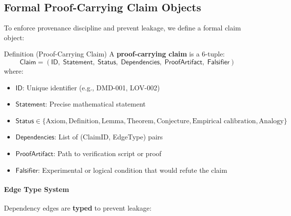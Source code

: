 
\subsection{Formal Proof-Carrying Claim Objects}

To enforce provenance discipline and prevent leakage, we define a formal claim object:

\begin{mytheorem}{Definition (Proof-Carrying Claim)}
\label{def:proof-carrying-claim}
A \textbf{proof-carrying claim} is a 6-tuple:
\[
\textsf{Claim} = (\textsf{ID},\; \textsf{Statement},\; \textsf{Status},\; \textsf{Dependencies},\; \textsf{ProofArtifact},\; \textsf{Falsifier})
\]
where:
\begin{itemize}
    \item $\textsf{ID}$: Unique identifier (e.g., DMD-001, LOV-002)
    \item $\textsf{Statement}$: Precise mathematical statement
    \item $\textsf{Status} \in \{\text{Axiom}, \text{Definition}, \text{Lemma}, \text{Theorem}, \text{Conjecture}, \text{Empirical calibration}, \text{Analogy}\}$
    \item $\textsf{Dependencies}$: List of (ClaimID, EdgeType) pairs
    \item $\textsf{ProofArtifact}$: Path to verification script or proof
    \item $\textsf{Falsifier}$: Experimental or logical condition that would refute the claim
\end{itemize}
\end{mytheorem}

\paragraph{Edge Type System}
Dependency edges are \textbf{typed} to prevent leakage:

